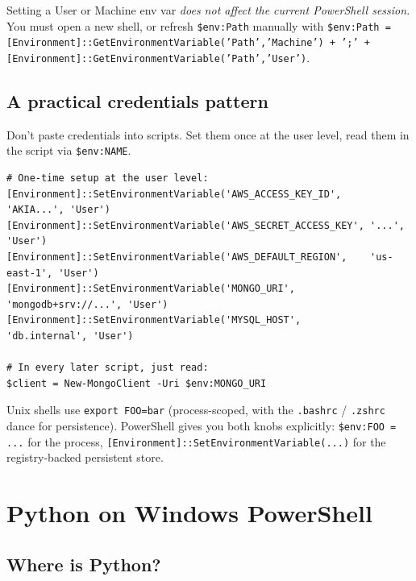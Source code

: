 \documentclass[11pt,a4paper]{article}
\newcommand{\bcmd}[1]{\texttt{\textcolor{bashKw}{#1}}}
\begin{document}
\begin{gotcha}
Setting a User or Machine env var \emph{does not affect the current
PowerShell session.} You must open a new shell, or refresh
\texttt{\$env:Path} manually with
\texttt{\$env:Path = [Environment]::GetEnvironmentVariable('Path','Machine') + ';' + [Environment]::GetEnvironmentVariable('Path','User')}.
\end{gotcha}

\subsection*{A practical credentials pattern}

Don't paste credentials into scripts. Set them once at the user level,
read them in the script via \texttt{\$env:NAME}.

\begin{lstlisting}[style=pwshstyle]
# One-time setup at the user level:
[Environment]::SetEnvironmentVariable('AWS_ACCESS_KEY_ID',     'AKIA...', 'User')
[Environment]::SetEnvironmentVariable('AWS_SECRET_ACCESS_KEY', '...',     'User')
[Environment]::SetEnvironmentVariable('AWS_DEFAULT_REGION',    'us-east-1', 'User')
[Environment]::SetEnvironmentVariable('MONGO_URI',             'mongodb+srv://...', 'User')
[Environment]::SetEnvironmentVariable('MYSQL_HOST',            'db.internal', 'User')

# In every later script, just read:
$client = New-MongoClient -Uri $env:MONGO_URI
\end{lstlisting}

\begin{compare}
Unix shells use \bcmd{export FOO=bar} (process-scoped, with the
\texttt{.bashrc} / \texttt{.zshrc} dance for persistence). PowerShell
gives you both knobs explicitly: \texttt{\$env:FOO = ...} for the
process, \texttt{[Environment]::SetEnvironmentVariable(...)} for the
registry-backed persistent store.
\end{compare}

\section{Python on Windows PowerShell}

\subsection*{Where is Python?}
\end{document}
